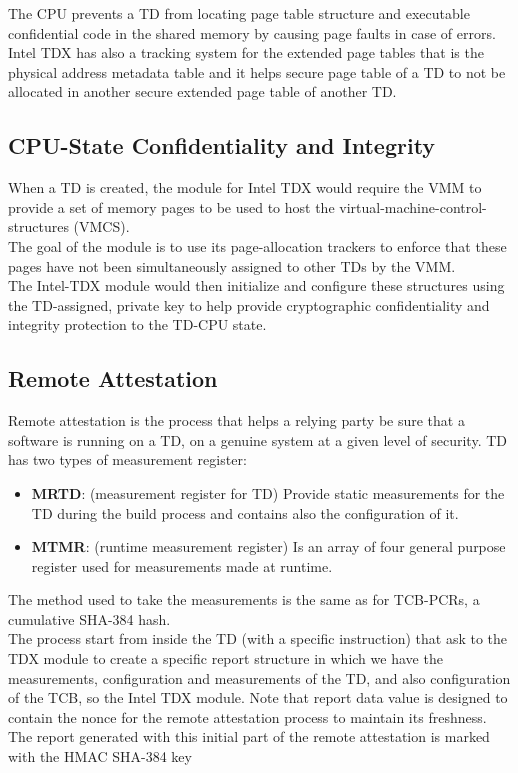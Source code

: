 The CPU prevents a TD from locating page table structure and
executable confidential code in the shared memory by causing page
faults in case of errors. \\ 
Intel TDX has also a tracking system for the extended page tables that
is the physical address metadata table and it helps secure page table
of a TD to not be allocated in another secure extended page table of
another TD.


\subsection{CPU-State Confidentiality and Integrity}
When a TD is created, the module for Intel TDX would require the VMM
to provide a set of memory pages to be used to host the
virtual-machine-control-structures (VMCS). \\
The goal of the module is to use its page-allocation trackers to
enforce that these pages have not been simultaneously assigned to
other TDs by the VMM. \\
The Intel-TDX module would then initialize and configure these
structures using the TD-assigned, private key to help provide
cryptographic confidentiality and integrity protection to the TD-CPU
state.


\subsection{Remote Attestation}
Remote attestation is the process that helps a relying party be sure
that a software is running on a TD, on a genuine system at a given
level of security. TD has two types of measurement register:
\begin{itemize}
  \item \textbf{MRTD}: (measurement register for TD) Provide static
    measurements for the TD during the build process and contains also
    the configuration of it.
  \item \textbf{MTMR}: (runtime measurement register) Is an array of
    four general purpose register used for measurements made at
    runtime.
\end{itemize}
The method used to take the measurements is the same as for TCB-PCRs,
a cumulative SHA-384 hash. \\
The process start from inside the TD (with a specific instruction)
that ask to the TDX module to create a specific report structure in
which we have the measurements, configuration and measurements of the
TD, and also configuration of the TCB, so the Intel TDX module. Note
that report data value is designed to contain the nonce for the remote
attestation process to maintain its freshness. \\
The report generated with this initial part of the remote attestation
is marked with the HMAC SHA-384 key

